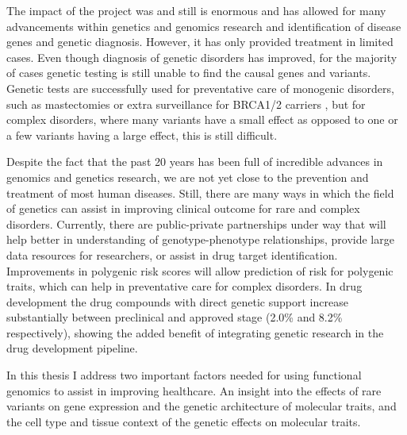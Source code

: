 The impact of the project was and still is enormous and has allowed for many advancements within genetics and genomics research\cite{chicheBenchtobedsideReviewFulfilling2002a} and identification of disease genes and genetic diagnosis\cite{claussnitzerBriefHistoryHuman2020b}. However, it has only provided treatment in limited cases. Even though diagnosis of genetic disorders has improved, for the majority of cases genetic testing is still unable to find the causal genes and variants\cite{diemenRapidTargetedGenomics2017a}. Genetic tests are successfully used for preventative care of monogenic disorders, such as mastectomies or extra surveillance for BRCA1/2 carriers \cite{heemskerk-gerritsenSurvivalBilateralRiskreducing2019a}, but for complex disorders, where many variants have a small effect as opposed to one or a few variants having a large effect, this is still difficult\cite{claussnitzerBriefHistoryHuman2020b}. 

Despite the fact that the past 20 years has been full of incredible advances in genomics and genetics research, we are not yet close to the prevention and treatment of most human diseases. Still, there are many ways in which the field of genetics can assist in improving clinical outcome for rare and complex disorders. Currently, there are public-private partnerships under way that will help better in understanding of genotype-phenotype relationships\cite{HomepageInternationalCommon}, provide large data resources for researchers\cite{fingennFinnGenDocumentationR32020,sudlowUKBiobankOpen2015}, or assist in drug target identification\cite{carvalho-silvaOpenTargetsPlatform2019}. Improvements in polygenic risk scores will allow prediction of risk for polygenic traits\cite{natarajanpradeepPolygenicRiskScore2017, kheraGenomewidePolygenicScores2018}, which can help in preventative care for complex disorders. In drug development the drug compounds with direct genetic support increase substantially between preclinical and approved stage (2.0\% and 8.2\% respectively\cite{nelsonSupportHumanGenetic2015b}), showing the added benefit of integrating genetic research in the drug development pipeline. %

In this thesis I address two important factors needed for using functional genomics to assist in improving healthcare. An insight into the effects of rare variants on gene expression and the genetic architecture of molecular traits, and the cell type and tissue context of the genetic effects on molecular traits.

